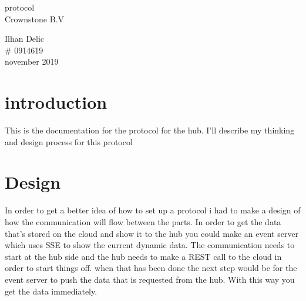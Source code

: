 \documentclass{article}
\begin{document}
\begin{titlepage}
		\begin{center}%
		{\huge{protocol}}\\ %
		[2cm]
		{\large Crownstone B.V }\\
		[15cm]
		\end{center} 
		\begin{flushright}
		{\large Ilhan Delic \\}
		\# 0914619 \\
		november 2019 \\
		\end{flushright}	
\end{titlepage}
\tableofcontents
\thispagestyle{empty}
\cleardoublepage %
\section{introduction}\label{sec:intro}%
This is the documentation for the protocol for the hub. I'll describe my thinking and design process for this protocol 
\section{Design}\label{sec:design}

In order to get a better idea of how to set up a protocol i had to make a design of how the communication will flow between the parts. In order to get the data that's stored on the cloud and show it to the hub you could make an event server which uses SSE to show the current dynamic data. The communication needs to start at the hub side and the hub needs to make a REST call to the cloud in order to start things off. when that has been done the next step would be for the event server to push the data that is requested from the hub. With this way you get the data immediately.\\
\end{document}
